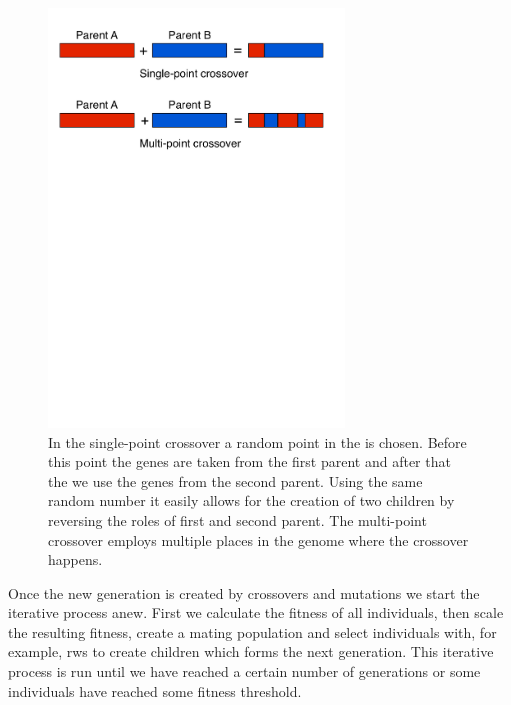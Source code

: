 \begin{figure}[htbp] %
   \centering
   \includegraphics[width=0.7\textwidth,trim=0 18cm 0 0]{chapter_ga/plots/crossovers.pdf} 
   \caption[Single-point and multi-point crossover]{In the single-point crossover a random point in the  is chosen. Before this point the genes are taken from the first parent and after that the we use the genes from the second parent. Using the same random number it easily allows for the creation of two children by reversing the roles of first and second parent. The multi-point crossover employs multiple places in the genome where the crossover happens.}
   \label{fig:crossover}
\end{figure}

Once the new generation is created by \glspl{crossover} and \glspl{mutation} we start the iterative process anew. First we calculate the \gls{fitness} of all \glspl{individual}, then scale the resulting \gls{fitness}, create a mating population and select \glspl{individual} with, for example, \gls{rws}  to create children which forms the next generation. This iterative process is run until we have reached a certain number of generations or some \glspl{individual} have reached some \gls{fitness} threshold. 

